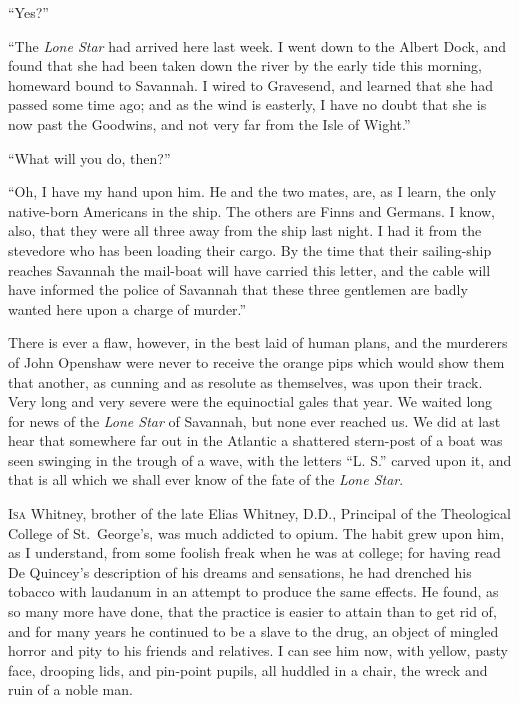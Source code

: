“Yes?”

“The \textit{Lone Star} had arrived here last week. I went down
to the Albert Dock, and found that she had been taken down
the river by the early tide this morning, homeward bound to
Savannah. I wired to Gravesend, and learned that she had
passed some time ago; and as the wind is easterly, I have no
doubt that she is now past the Goodwins, and not very far
from the Isle of Wight.”

“What will you do, then?”

“Oh, I have my hand upon him. He and the two mates,
are, as I learn, the only native-born Americans in the ship.
The others are Finns and Germans. I know, also, that they
were all three away from the ship last night. I had it from
the stevedore who has been loading their cargo. By the time
that their sailing-ship reaches Savannah the mail-boat will
have carried this letter, and the cable will have informed the
police of Savannah that these three gentlemen are badly wanted
here upon a charge of murder.”

There is ever a flaw, however, in the best laid of human
plans, and the murderers of John Openshaw were never to receive
the orange pips which would show them that another, as
cunning and as resolute as themselves, was upon their track.
Very long and very severe were the equinoctial gales that
year. We waited long for news of the \textit{Lone Star} of Savannah,
but none ever reached us. We did at last hear that
somewhere far out in the Atlantic a shattered stern-post of a
boat was seen swinging in the trough of a wave, with the letters
“L. S.” carved upon it, and that is all which we shall
ever know of the fate of the \textit{Lone Star}.


\textsc{Isa} Whitney, brother of the late Elias Whitney,
D.D., Principal of the Theological College
of St.~George’s, was much addicted to opium.
The habit grew upon him, as I understand, from
some foolish freak when he was at college; for having read
De Quincey’s description of his dreams and sensations, he
had drenched his tobacco with laudanum in an attempt to
produce the same effects. He found, as so many more have
done, that the practice is easier to attain than to get rid of,
and for many years he continued to be a slave to the drug,
an object of mingled horror and pity to his friends and relatives.
I can see him now, with yellow, pasty face, drooping
lids, and pin-point pupils, all huddled in a chair, the wreck
and ruin of a noble man.

